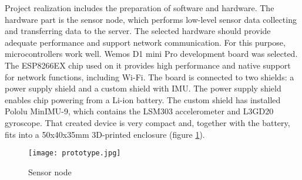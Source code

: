 Project realization includes the preparation of software and hardware. The hardware part is the sensor node, which performs low-level sensor data collecting and transferring data to the server. The selected hardware should provide adequate performance and support network communication. For this purpose, microcontrollers work well. Wemos D1 mini Pro development board was selected. The ESP8266EX chip used on it provides high performance and native support for network functions, including Wi-Fi. The board is connected to two shields: a power supply shield and a custom shield with IMU. The power supply shield enables chip powering from a Li-ion battery. The custom shield has installed Pololu MinIMU-9, which contains the LSM303 accelerometer and L3GD20 gyroscope. That created device is very compact and, together with the battery, fits into a 50x40x35mm 3D-printed enclosure (figure \ref{prototype}).

\begin{figure}[!h]
	\begin{center}
		\texttt{[image: prototype.jpg]}
	\end{center}
	\caption{Sensor node}
	\label{prototype}
\end{figure}


